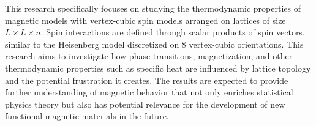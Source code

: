 This research specifically focuses on studying the thermodynamic properties of magnetic models with vertex-cubic spin models arranged on lattices of size $L \times L \times n$. Spin interactions are defined through scalar products of spin vectors, similar to the Heisenberg model discretized on 8 vertex-cubic orientations. This research aims to investigate how phase transitions, magnetization, and other thermodynamic properties such as specific heat are influenced by lattice topology and the potential frustration it creates. The results are expected to provide further understanding of magnetic behavior that not only enriches statistical physics theory but also has potential relevance for the development of new functional magnetic materials in the future. 